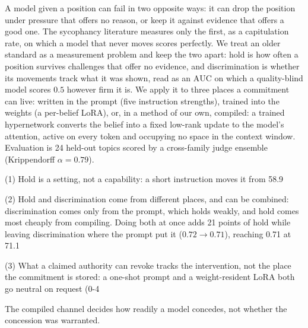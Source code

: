 A model given a position can fail in two opposite ways: it can drop the position under pressure that offers no reason, or keep it against evidence that offers a good one. The sycophancy literature measures only the first, as a capitulation rate, on which a model that never moves scores perfectly. We treat an older standard as a measurement problem and keep the two apart: hold is how often a position survives challenges that offer no evidence, and discrimination is whether its movements track what it was shown, read as an $\mathrm{AUC}$ on which a quality-blind model scores $0.5$ however firm it is. We apply it to three places a commitment can live: written in the prompt (five instruction strengths), trained into the weights (a per-belief LoRA), or, in a method of our own, compiled: a trained hypernetwork converts the belief into a fixed low-rank update to the model's attention, active on every token and occupying no space in the context window. Evaluation is 24 held-out topics scored by a cross-family judge ensemble (Krippendorff $\alpha = 0.79$).

(1) Hold is a setting, not a capability: a short instruction moves it from 58.9%

(2) Hold and discrimination come from different places, and can be combined: discrimination comes only from the prompt, which holds weakly, and hold comes most cheaply from compiling. Doing both at once adds 21 points of hold while leaving discrimination where the prompt put it ($0.72 \to 0.71$), reaching 0.71 at 71.1%

(3) What a claimed authority can revoke tracks the intervention, not the place the commitment is stored: a one-shot prompt and a weight-resident LoRA both go neutral on request (0-4%

The compiled channel decides how readily a model concedes, not whether the concession was warranted.
